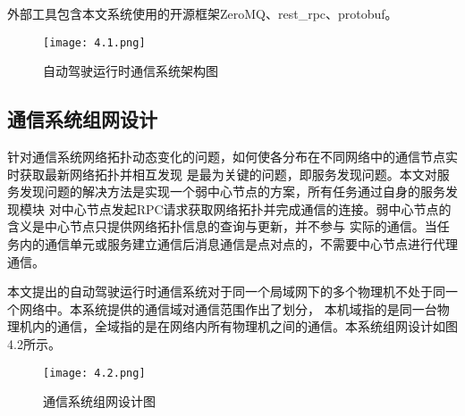 外部工具包含本文系统使用的开源框架ZeroMQ、rest\_rpc、protobuf。

\begin{figure}[htb]
    \centering
    \texttt{[image: 4.1.png]}
    \caption{自动驾驶运行时通信系统架构图}
    \label{fig:35}
  \end{figure}

\subsection{通信系统组网设计}
针对通信系统网络拓扑动态变化的问题，如何使各分布在不同网络中的通信节点实时获取最新网络拓扑并相互发现
是最为关键的问题，即服务发现问题。本文对服务发现问题的解决方法是实现一个弱中心节点的方案，所有任务通过自身的服务发现模块
对中心节点发起RPC请求获取网络拓扑并完成通信的连接。弱中心节点的含义是中心节点只提供网络拓扑信息的查询与更新，并不参与
实际的通信。当任务内的通信单元或服务建立通信后消息通信是点对点的，不需要中心节点进行代理通信。

本文提出的自动驾驶运行时通信系统对于同一个局域网下的多个物理机不处于同一个网络中。本系统提供的通信域对通信范围作出了划分，
本机域指的是同一台物理机内的通信，全域指的是在网络内所有物理机之间的通信。本系统组网设计如图4.2所示。

\begin{figure}[htb]
  \centering
  \texttt{[image: 4.2.png]}
  \caption{通信系统组网设计图}
  \label{fig:23}
\end{figure}

